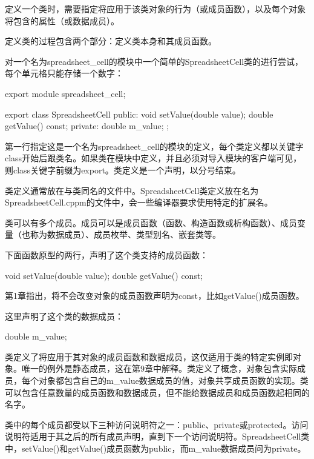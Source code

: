 
定义一个类时，需要指定将应用于该类对象的行为（或成员函数），以及每个对象将包含的属性（或数据成员）。

定义类的过程包含两个部分：定义类本身和其成员函数。


对一个名为spreadsheet\_cell的模块中一个简单的SpreadsheetCell类的进行尝试，每个单元格只能存储一个数字：

\begin{cpp}
export module spreadsheet_cell;

export class SpreadsheetCell
{
    public:
        void setValue(double value);
        double getValue() const;
    private:
        double m_value;
};
\end{cpp}

第一行指定这是一个名为spreadsheet\_cell的模块的定义，每个类定义都以关键字class开始后跟类名。如果类在模块中定义，并且必须对导入模块的客户端可见，则class关键字前缀为export。类定义是一个声明，以分号结束。

类定义通常放在与类同名的文件中。SpreadsheetCell类定义放在名为SpreadsheetCell.cppm的文件中，会一些编译器要求使用特定的扩展名。


类可以有多个成员。成员可以是成员函数（函数、构造函数或析构函数）、成员变量（也称为数据成员）、成员枚举、类型别名、嵌套类等。

下面函数原型的两行，声明了这个类支持的成员函数：

\begin{cpp}
void setValue(double value);
double getValue() const;
\end{cpp}

第1章指出，将不会改变对象的成员函数声明为const，比如getValue()成员函数。

这里声明了这个类的数据成员：

\begin{cpp}
double m_value;
\end{cpp}

类定义了将应用于其对象的成员函数和数据成员，这仅适用于类的特定实例即对象。唯一的例外是静态成员，这在第9章中解释。类定义了概念，对象包含实际成员，每个对象都包含自己的m\_value数据成员的值，对象共享成员函数的实现。类可以包含任意数量的成员函数和数据成员，但不能给数据成员和成员函数起相同的名字。


类中的每个成员都受以下三种访问说明符之一：public、private或protected。访问说明符适用于其之后的所有成员声明，直到下一个访问说明符。SpreadsheetCell类中，setValue()和getValue()成员函数为public，而m\_value数据成员问为private。


